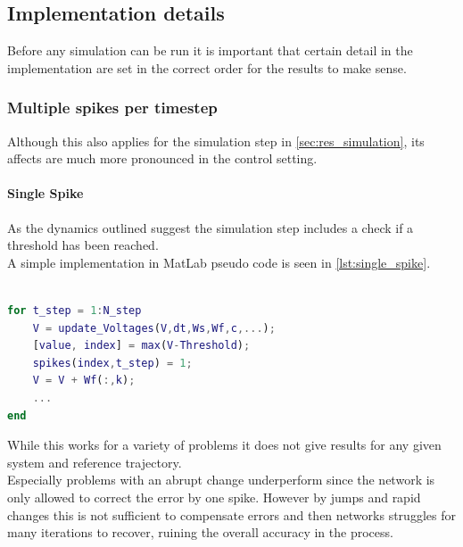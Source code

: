 \subsection{Implementation details}
Before any simulation can be run it is important that certain detail in the implementation are set in the correct order for the results to make sense.


\subsubsection{Multiple spikes per timestep}
Although this also applies for the simulation step in \cref{sec:res_simulation}, its affects are much more pronounced in the control setting.\\
\paragraph{Single Spike}
As the dynamics outlined suggest the simulation step includes a check if a threshold has been reached. \\
A simple implementation in MatLab pseudo code is seen in \cref{lst:single_spike}.

\begin{lstlisting}[language=Matlab, caption=Single spike implementation,label=lst:single_spike]

for t_step = 1:N_step
	V = update_Voltages(V,dt,Ws,Wf,c,...);
	[value, index] = max(V-Threshold);
	spikes(index,t_step) = 1;
	V = V + Wf(:,k);
	...
end
\end{lstlisting}
While this works for a variety of problems it does not give results for any given system and reference trajectory.\\
Especially problems with an abrupt change underperform since the network is only allowed to correct the error by one spike. However by jumps and rapid changes this is not sufficient to compensate errors and then networks struggles for many iterations to recover, ruining the overall accuracy in the process.
